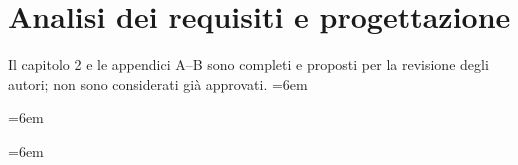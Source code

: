 \chapter{Analisi dei requisiti e progettazione}\label{ch:progettazione}
Il capitolo 2 e le appendici A--B sono completi e proposti per la revisione
degli autori; non sono considerati già approvati.
\begingroup
\emergencystretch=6em
\setcounter{secnumdepth}{3}

\endgroup

\begingroup
\emergencystretch=6em

\endgroup

\begingroup
\emergencystretch=6em


\endgroup

\setcounter{secnumdepth}{2}
